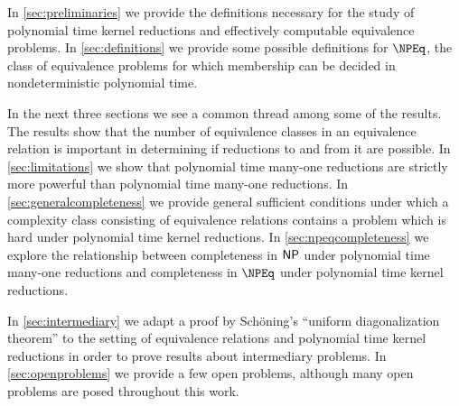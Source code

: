 In \autoref{sec:preliminaries} we provide the definitions necessary for the study of polynomial time kernel reductions and effectively computable equivalence problems.
In \autoref{sec:definitions} we provide some possible definitions for $\NPEq$, the class of equivalence problems for which membership can be decided in nondeterministic polynomial time.

In the next three sections we see a common thread among some of the results.
The results show that the number of equivalence classes in an equivalence relation is important in determining if reductions to and from it are possible.
In \autoref{sec:limitations} we show that polynomial time many-one reductions are strictly more powerful than polynomial time many-one reductions.
In \autoref{sec:generalcompleteness} we provide general sufficient conditions under which a complexity class consisting of equivalence relations contains a problem which is hard under polynomial time kernel reductions.
In \autoref{sec:npeqcompleteness} we explore the relationship between completeness in ${\mathsf{NP}}$ under polynomial time many-one reductions and completeness in $\NPEq$ under polynomial time kernel reductions.

In \autoref{sec:intermediary} we adapt a proof by Sch\"{o}ning's ``uniform diagonalization theorem'' to the setting of equivalence relations and polynomial time kernel reductions in order to prove results about intermediary problems.
In \autoref{sec:openproblems} we provide a few open problems, although many open problems are posed throughout this work.


